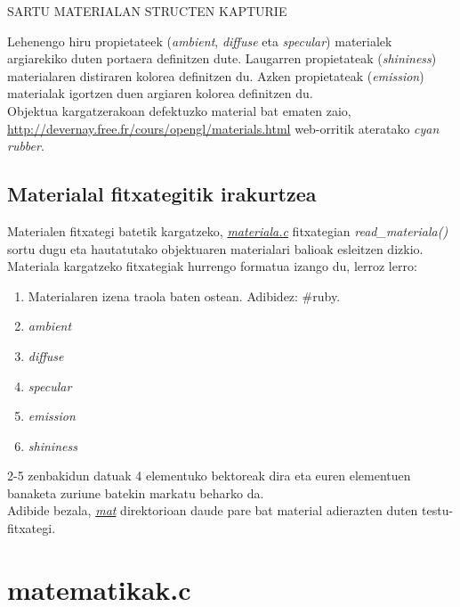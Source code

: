 \documentclass[12pt]{article}
\newcommand{\fitxategi}[1] {\underline{\textit{#1}}}
\newcommand{\metodo}[1] {\textit{#1}}
\newcommand{\aldagai}[1] {\textit{#1}}
\begin{document}
SARTU MATERIALAN STRUCTEN KAPTURIE

Lehenengo hiru propietateek (\aldagai{ambient}, \aldagai{diffuse} eta \aldagai{specular}) materialek argiarekiko duten portaera definitzen dute. Laugarren propietateak (\aldagai{shininess}) materialaren distiraren kolorea definitzen du. Azken propietateak (\aldagai{emission}) materialak igortzen duen argiaren kolorea definitzen du.\\

Objektua kargatzerakoan defektuzko material bat ematen zaio, \url{http://devernay.free.fr/cours/opengl/materials.html} web-orritik ateratako \textit{cyan rubber}.

\subsection{Materialal fitxategitik irakurtzea}

Materialen fitxategi batetik kargatzeko, \fitxategi{materiala.c} fitxategian \metodo{read\_materiala()} sortu dugu eta hautatutako objektuaren materialari balioak esleitzen dizkio.\\

Materiala kargatzeko fitxategiak hurrengo formatua izango du, lerroz lerro:
\begin{enumerate}

\item Materialaren izena traola baten ostean. Adibidez: \#ruby.

\item \aldagai{ambient}

\item \aldagai{diffuse}

\item \aldagai{specular}

\item \aldagai{emission}

\item \aldagai{shininess}

\end{enumerate}

2-5 zenbakidun datuak 4 elementuko bektoreak dira eta euren elementuen banaketa zuriune batekin markatu beharko da.\\

Adibide bezala, \fitxategi{mat} direktorioan daude pare bat material adierazten duten testu-fitxategi.


\section{matematikak.c}\label{matematikak}
\end{document}
